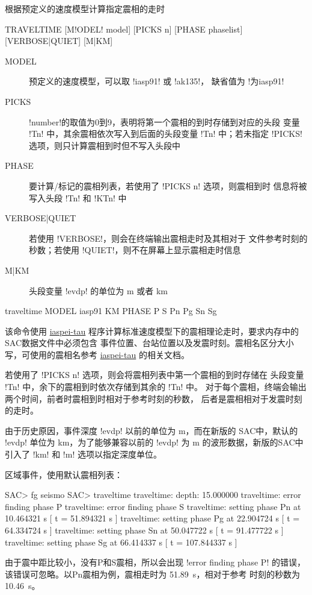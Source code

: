 \label{cmd:traveltime}

根据预定义的速度模型计算指定震相的走时

\begin{SACSTX}
TRAVELTIME [M!ODEL! model] [PICKS n] [PHASE phaselist] [VERBOSE|QUIET] [M|KM]
\end{SACSTX}

\begin{description}
\item [MODEL] 预定义的速度模型，可以取 !iasp91! 或 !ak135!，
    缺省值为 !为iasp91!
\item [PICKS] !number!的取值为0到9，表明将第一个震相的到时存储到对应的头段
    变量 !Tn! 中，其余震相依次写入到后面的头段变量 !Tn! 中；若未指定
    !PICKS!选项，则只计算震相到时但不写入头段中
\item [PHASE] 要计算/标记的震相列表，若使用了 !PICKS n! 选项，则震相到时
    信息将被写入头段 !Tn! 和 !KTn! 中
\item [VERBOSE|QUIET] 若使用 !VERBOSE!，则会在终端输出震相走时及其相对于
    文件参考时刻的秒数；若使用 !QUIET!，则不在屏幕上显示震相走时信息
\item [M|KM] 头段变量 !evdp! 的单位为 \si{\m} 或者 \si{\km}
\end{description}

\begin{SACDFT}
traveltime MODEL iasp91 KM PHASE P S Pn Pg Sn Sg
\end{SACDFT}

该命令使用 \href{https://seiscode.iris.washington.edu/projects/iaspei-tau}{iaspei-tau}
程序计算标准速度模型下的震相理论走时，要求内存中的SAC数据文件中必须包含
事件位置、台站位置以及发震时刻。震相名区分大小写，可使用的震相名参考
\href{https://seiscode.iris.washington.edu/projects/iaspei-tau}{iaspei-tau}
的相关文档。

若使用了 !PICKS n! 选项，则会将震相列表中第一个震相的到时存储在
头段变量 !Tn! 中，余下的震相到时依次存储到其余的 !Tn! 中。
对于每个震相，终端会输出两个时间，前者时震相到时相对于参考时刻的秒数，
后者是震相相对于发震时刻的走时。

由于历史原因，事件深度 !evdp! 以前的单位为 \si{\m}，而在新版的
SAC中，默认的 !evdp! 单位为 \si{\km}，为了能够兼容以前的
!evdp! 为 \si{\m} 的波形数据，新版的SAC中引入了 !km! 和
!m! 选项以指定深度单位。

区域事件，使用默认震相列表：
\begin{SACCode}
SAC> fg seismo
SAC> traveltime
traveltime: depth: 15.000000
traveltime: error finding phase P
traveltime: error finding phase S
traveltime: setting phase Pn       at 10.464321 s [ t = 51.894321 s ]
traveltime: setting phase Pg       at 22.904724 s [ t = 64.334724 s ]
traveltime: setting phase Sn       at 50.047722 s [ t = 91.477722 s ]
traveltime: setting phase Sg       at 66.414337 s [ t = 107.844337 s ]
\end{SACCode}
由于震中距比较小，没有P和S震相，所以会出现 !error finding phase P!
的错误，该错误可忽略。以Pn震相为例，震相走时为 \SI{51.89}{\s}，相对于参考
时刻的秒数为 \SI{10.46}{\s}。

